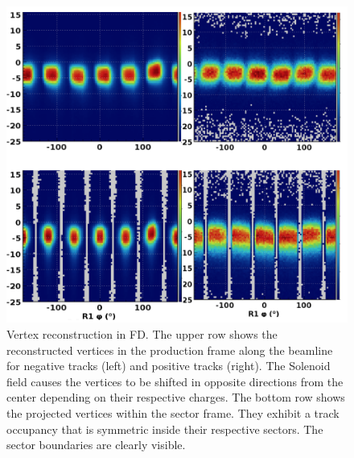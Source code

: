 \documentclass[final,3p,twocolumn]{elsarticle}
\begin{document}
\begin{figure}[htbp!]
\centerline {
\includegraphics[width=0.96\columnwidth]{tracking_vertices.png}}
\caption{Vertex reconstruction in FD. The upper row shows the reconstructed vertices in the production frame along
the beamline for negative tracks (left) and positive tracks (right). The Solenoid field causes the vertices to be shifted
in opposite directions from the center depending on their respective charges. The bottom row shows the projected
vertices within the sector frame. They exhibit a track occupancy that is symmetric inside their respective sectors. The
sector boundaries are clearly visible.} 
\label{vertex}
\end{figure}
\end{document}
